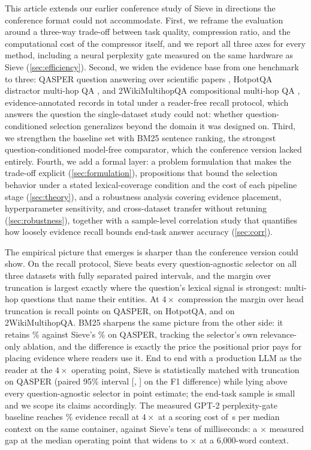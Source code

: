 \documentclass[review,12pt]{elsarticle}
\theoremstyle{remark}
\newcommand{\method}{Sieve}
\begin{document}
This article extends our earlier conference study of \method{} in
directions the conference format could not accommodate. First, we
reframe the evaluation around a three-way trade-off between task
quality, compression ratio, and the computational cost of the
compressor itself, and we report all three axes for every method,
including a neural perplexity gate measured on the same hardware as
\method{} (\autoref{sec:efficiency}). Second, we widen the evidence
base from one benchmark to three: QASPER question answering over
scientific papers \citep{dasigi2021qasper}, HotpotQA distractor
multi-hop QA \citep{yang2018hotpotqa}, and 2WikiMultihopQA
compositional multi-hop QA \citep{ho2020wiki}, \TotalRecords{}
evidence-annotated records in total under a reader-free recall
protocol, which answers the question the single-dataset study could
not: whether question-conditioned selection generalizes beyond the
domain it was designed on. Third, we strengthen the baseline set with
BM25 sentence ranking, the strongest question-conditioned model-free
comparator, which the conference version lacked entirely. Fourth, we
add a formal layer: a problem formulation that makes the trade-off
explicit (\autoref{sec:formulation}), propositions that bound the
selection behavior under a stated lexical-coverage condition and the
cost of each pipeline stage (\autoref{sec:theory}), and a robustness
analysis covering evidence placement, hyperparameter sensitivity, and
cross-dataset transfer without retuning (\autoref{sec:robustness}),
together with a sample-level correlation study that quantifies how
loosely evidence recall bounds end-task answer accuracy
(\autoref{sec:corr}).

The empirical picture that emerges is sharper than the conference
version could show. On the recall protocol, \method{} beats every
question-agnostic selector on all three datasets with fully separated
paired intervals, and the margin over truncation is largest exactly
where the question's lexical signal is strongest: multi-hop questions
that name their entities. At $4\times$ compression the margin over
head truncation is \PairQSH{} recall points on QASPER, \PairHSH{} on
HotpotQA, and \PairWSH{} on 2WikiMultihopQA. BM25 sharpens the same
picture from the other side: it retains \RecQBm\% against
\method{}'s \RecQSie\% on QASPER, tracking the selector's own
relevance-only ablation, and the difference is exactly the price the
positional prior pays for placing evidence where readers use it.
End to end with a production LLM as the reader at the $4\times$
operating point, \method{} is statistically matched with truncation
on QASPER (paired 95\% interval [\QAPairSHLo, \QAPairSHHi] on the F1
difference) while lying above every question-agnostic selector in
point estimate; the end-task sample is small and we scope its claims
accordingly. The measured GPT-2
perplexity-gate baseline reaches \GateRecall\% evidence recall at
$4\times$ at a scoring cost of \GateLatMedCtxS\,s per median context
on the same container, against \method{}'s tens of milliseconds: a
\GateSieRatioMed$\times$ measured gap at the median operating point
that widens to \GateSieRatioSixk$\times$ at a 6{,}000-word context.
\end{document}
